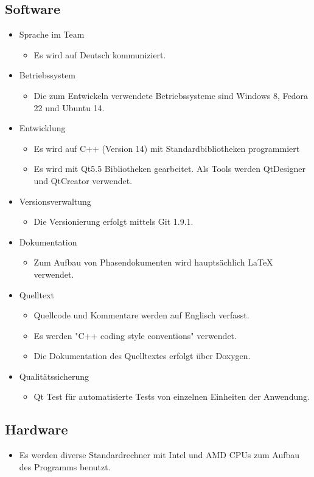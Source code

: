 \subsection{Software}
\begin{itemize}
\item Sprache im Team
	\begin{itemize}[label={--}]
		\item Es wird auf Deutsch kommuniziert.
	\end{itemize}
\item Betriebssystem
	\begin{itemize}[label={--}]
		\item Die zum Entwickeln verwendete Betriebssysteme sind Windows 8, Fedora 22 und Ubuntu 14.
	\end{itemize}
\item Entwicklung
	\begin{itemize}[label={--}]
		\item Es wird auf C++ (Version 14) mit Standardbibliotheken programmiert
		\item Es wird mit Qt5.5 Bibliotheken gearbeitet. Als Tools werden QtDesigner und QtCreator verwendet.
	\end{itemize}
\item Versionsverwaltung
	\begin{itemize}[label={--}]
		\item Die Versionierung erfolgt mittels Git 1.9.1.
	\end{itemize}
\item Dokumentation
	\begin{itemize}[label={--}]
		\item Zum Aufbau von Phasendokumenten wird hauptsächlich LaTeX verwendet.
	\end{itemize}
\item Quelltext
	\begin{itemize}[label={--}]
		\item Quellcode und Kommentare werden auf Englisch verfasst.
		\item Es werden "C++ coding style conventions" verwendet.
		\item Die Dokumentation des Quelltextes erfolgt über Doxygen.
	\end{itemize}
\item Qualitätssicherung
	\begin{itemize}[label={--}]
		\item Qt Test für automatisierte Tests von einzelnen Einheiten der Anwendung.
	\end{itemize}

\end{itemize}

\subsection{Hardware}
\begin{itemize}
	\item Es werden diverse Standardrechner mit Intel und AMD CPUs zum Aufbau des Programms benutzt.
\end{itemize}
\pagebreak